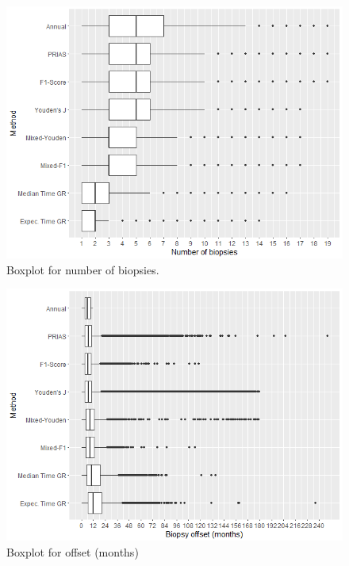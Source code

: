 \begin{figure}
	\centerline{\includegraphics[width=\columnwidth]{images/sim_study/nbBoxPlot_all.png}}
    \caption{Boxplot for number of biopsies.}
    \label{fig : nbBoxPlot}
\end{figure}

\begin{figure}
	\centerline{\includegraphics[width=\columnwidth]{images/sim_study/offsetBoxPlot_all.png}}
    \caption{Boxplot for offset (months)}
    \label{fig : offsetBoxPlot}
\end{figure}
